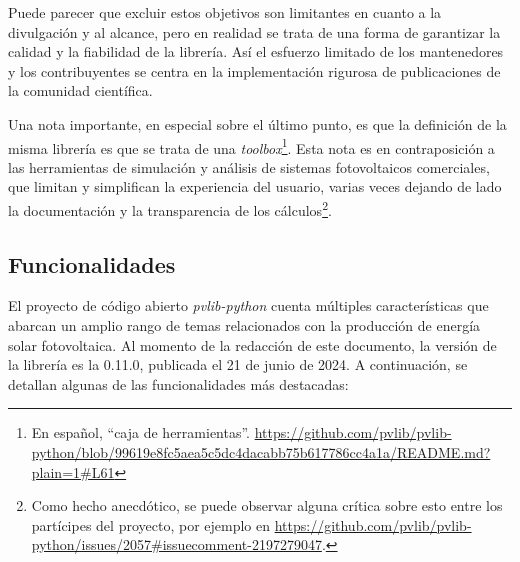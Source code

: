 Puede parecer que excluir estos objetivos son limitantes en cuanto a la divulgación y al alcance, pero en realidad se trata de una forma de garantizar la calidad y la fiabilidad de la librería. Así el esfuerzo limitado de los mantenedores y los contribuyentes se centra en la implementación rigurosa de publicaciones de la comunidad científica.

Una nota importante, en especial sobre el último punto, es que la definición de la misma librería es que se trata de una \textit{toolbox}\footnote{En español, ``caja de herramientas''. \url{https://github.com/pvlib/pvlib-python/blob/99619e8fc5aea5c5dc4dacabb75b617786cc4a1a/README.md?plain=1\#L61}}. Esta nota es en contraposición a las herramientas de simulación y análisis de sistemas fotovoltaicos comerciales, que limitan y simplifican la experiencia del usuario, varias veces dejando de lado la documentación y la transparencia de los cálculos\footnote{Como hecho anecdótico, se puede observar alguna crítica sobre esto entre los partícipes del proyecto, por ejemplo en \url{https://github.com/pvlib/pvlib-python/issues/2057\#issuecomment-2197279047}.}.

\subsection{Funcionalidades} \label{ssct:pvlib:funcionalidades}

El proyecto de código abierto \textit{pvlib-python} cuenta múltiples características que abarcan un amplio rango de temas relacionados con la producción de energía solar fotovoltaica. Al momento de la redacción de este documento, la versión de la librería es la 0.11.0, publicada el 21 de junio de 2024. A continuación, se detallan algunas de las funcionalidades más destacadas:

